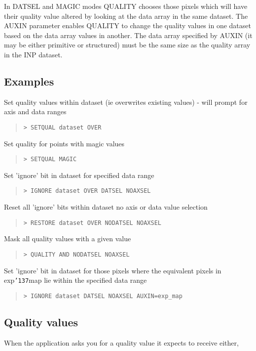 \documentclass{book}
\renewcommand{\_}{{\tt\char'137}}     %
\begin{document}
In DATSEL and MAGIC modes QUALITY chooses those pixels which will
have their quality value altered by looking at the data array in
the same dataset. The AUXIN parameter enables QUALITY to change
the quality values in one dataset based on the data array values
in another. The data array specified by AUXIN (it may be either
primitive or structured) must be the same size as the quality
array in the INP dataset.

\subsection{Examples}
Set quality values within dataset (ie overwrites existing values) -
will prompt for axis and data ranges
\begin{quote}\begin{verbatim}
> SETQUAL dataset OVER
\end{verbatim}\end{quote}
Set quality for points with magic values
\begin{quote}\begin{verbatim}
> SETQUAL MAGIC
\end{verbatim}\end{quote}
Set 'ignore' bit in dataset for specified data range
\begin{quote}\begin{verbatim}
> IGNORE dataset OVER DATSEL NOAXSEL
\end{verbatim}\end{quote}
Reset all 'ignore' bits within dataset no axis or data value selection
\begin{quote}\begin{verbatim}
> RESTORE dataset OVER NODATSEL NOAXSEL
\end{verbatim}\end{quote}
Mask all quality values with a given value
\begin{quote}\begin{verbatim}
> QUALITY AND NODATSEL NOAXSEL
\end{verbatim}\end{quote}
Set 'ignore' bit in dataset for those pixels where the equivalent
pixels in exp\_map lie within the specified data range
\begin{quote}\begin{verbatim}
> IGNORE dataset DATSEL NOAXSEL AUXIN=exp_map
\end{verbatim}\end{quote}
\subsection{Quality values}
When the application asks you for a quality value it expects to
receive either,
\end{document}
